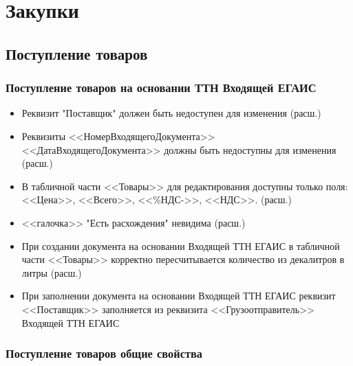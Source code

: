 \section{Закупки}
\subsection{Поступление товаров}
\subsubsection{Поступление товаров на основании ТТН Входящей ЕГАИС}



\begin{itemize}
	\item Реквизит "Поставщик" должен быть недоступен для изменения (расш.)
	\item Реквизиты <<НомерВходящегоДокумента>> <<ДатаВходящегоДокумента>> должны быть недоступны для изменения (расш.)
	\item В табличной части <<Товары>> для редактирования доступны только поля:
	<<Цена>>, <<Всего>>, <<\%НДС->>, <<НДС>>.  (расш.)
	\item <<галочка>> "Есть расхождения" невидима (расш.)
	\item При создании документа на основании Входящей ТТН ЕГАИС в табличной части <<Товары>>
	корректно пересчитывается количество из  декалитров в литры (расш.)
	\item При заполнении документа на основании Входящей ТТН ЕГАИС реквизит <<Поставщик>> заполняется из реквизита <<Грузоотправитель>> Входящей ТТН ЕГАИС
	
\end{itemize}

\subsubsection{Поступление товаров общие свойства}

